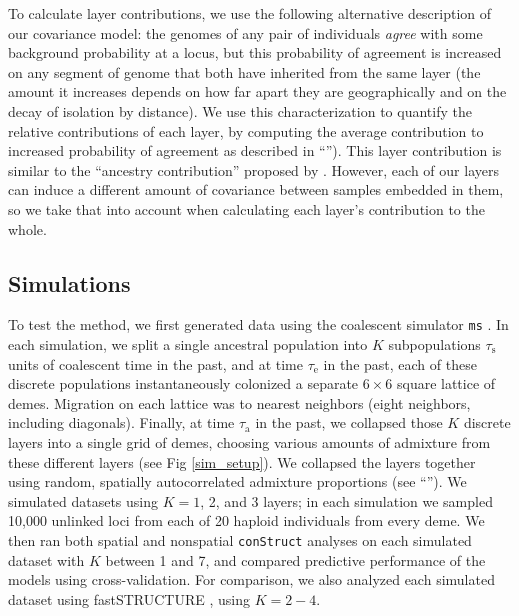 \documentclass[10pt,letterpaper]{article}
\newcommand{\secref}[1]{``\nameref{#1}''}
\begin{document}
To calculate layer contributions, we use the following alternative description of our covariance model:
the genomes of any pair of individuals \emph{agree} with some
background probability at a locus,
but this probability of agreement is increased on any segment of genome 
that both have inherited from the same layer 
(the amount it increases depends on how far apart they are
geographically and on the decay of isolation by distance).
We use this characterization to quantify the relative contributions of each layer,
by computing the average contribution to increased probability of agreement
as described in \secref{layer_contribution}). 
This layer contribution is similar to the ``ancestry contribution'' proposed by \cite{fastStructure}. 
However, each of our layers can induce a different amount of covariance between samples embedded in them, 
so we take that into account when calculating each layer's contribution to the whole.


\subsection*{Simulations}

To test the method, we first generated data using the coalescent simulator \texttt{ms} \cite{Hudson2002}.
In each simulation,
we split a single ancestral population into $K$ subpopulations $\tau_{\text{s}}$ units of coalescent time in the past,
and at time $\tau_{\text{e}}$ in the past,
each of these discrete populations instantaneously colonized a
separate $6 \times 6$ square lattice of demes.
Migration on each lattice was to nearest neighbors (eight neighbors, including diagonals).
Finally, at time $\tau_{\text{a}}$ in the past, 
we collapsed those $K$ discrete layers into a single grid of demes,
choosing various amounts of admixture from these different layers
(see Fig \ref{sim_setup}). 
We collapsed the layers together using random, spatially autocorrelated admixture proportions 
(see \secref{sim_details}).
We simulated datasets using $K=1$, 2, and 3 layers;
in each simulation we sampled 10,000 unlinked loci from each of 20 haploid individuals from every deme.
We then ran both spatial and nonspatial \texttt{conStruct} analyses on each simulated dataset with $K$ between 1 and 7,
and compared predictive performance of the models using cross-validation.
For comparison,
we also analyzed each simulated dataset using fastSTRUCTURE \cite{fastStructure}, using $K=2-4$.
\end{document}
